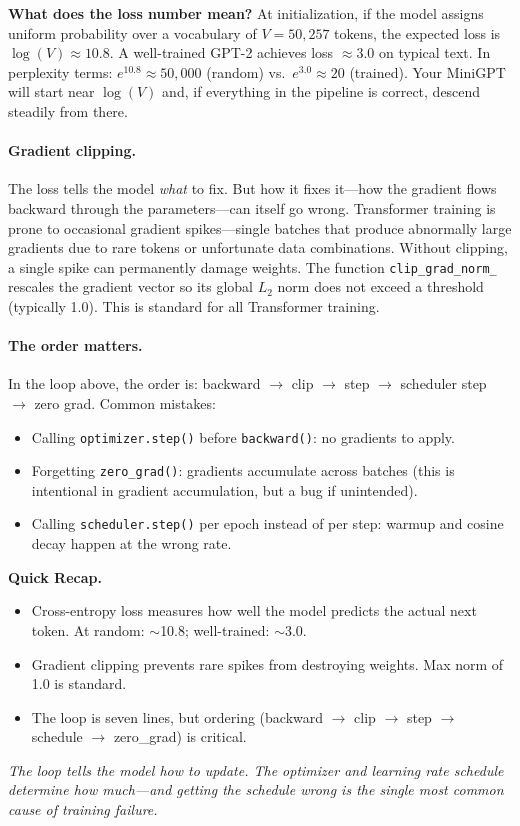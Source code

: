 \textbf{What does the loss number mean?} At initialization, if the model assigns uniform probability over a vocabulary of $V = 50{,}257$ tokens, the expected loss is $\log(V) \approx 10.8$. A well-trained GPT-2 achieves loss $\approx 3.0$ on typical text. In perplexity terms: $e^{10.8} \approx 50{,}000$ (random) vs.\ $e^{3.0} \approx 20$ (trained). Your MiniGPT will start near $\log(V)$ and, if everything in the pipeline is correct, descend steadily from there.

\paragraph{Gradient clipping.} The loss tells the model \emph{what} to fix. But how it fixes it---how the gradient flows backward through the parameters---can itself go wrong. Transformer training is prone to occasional gradient spikes---single batches that produce abnormally large gradients due to rare tokens or unfortunate data combinations. Without clipping, a single spike can permanently damage weights. The function \texttt{clip\_grad\_norm\_} rescales the gradient vector so its global $L_2$ norm does not exceed a threshold (typically 1.0). This is standard for all Transformer training.

\paragraph{The order matters.} In the loop above, the order is: backward $\to$ clip $\to$ step $\to$ scheduler step $\to$ zero grad. Common mistakes:

\begin{itemize}[nosep]
  \item Calling \texttt{optimizer.step()} before \texttt{backward()}: no gradients to apply.
  \item Forgetting \texttt{zero\_grad()}: gradients accumulate across batches (this is intentional in gradient accumulation, but a bug if unintended).
  \item Calling \texttt{scheduler.step()} per epoch instead of per step: warmup and cosine decay happen at the wrong rate.
\end{itemize}

\begin{quickrecap}
\textbf{Quick Recap.}
\begin{itemize}[nosep,leftmargin=1.5em]
  \item Cross-entropy loss measures how well the model predicts the actual next token. At random: $\sim$10.8; well-trained: $\sim$3.0.
  \item Gradient clipping prevents rare spikes from destroying weights. Max norm of 1.0 is standard.
  \item The loop is seven lines, but ordering (backward $\to$ clip $\to$ step $\to$ schedule $\to$ zero\_grad) is critical.
\end{itemize}
\textit{The loop tells the model \emph{how} to update. The optimizer and learning rate schedule determine \emph{how much}---and getting the schedule wrong is the single most common cause of training failure.}
\end{quickrecap}


